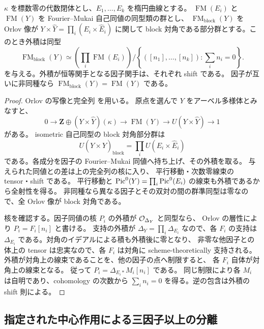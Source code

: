 \begin{lemma}
\label{mbfc:lem:factorization}
$\kappa$ を標数零の代数閉体とし、$E_1,\ldots,E_k$ を楕円曲線とする。
$\operatorname{FM}(E_i)$ と $\operatorname{FM}(Y)$ を
Fourier--Mukai 自己同値の同型類の群とし、
$\operatorname{FM}_{\mathrm{block}}(Y)$ を Orlov 像が
$Y\times\widehat Y=\prod_i(E_i\times\widehat E_i)$ に関して
block 対角である部分群とする。このとき外積は同型
\begin{equation}\label{mbfc:eq:factorization}
 \operatorname{FM}_{\mathrm{block}}(Y)
 \simeq
 \left(\prod_i\operatorname{FM}(E_i)\right)
 \big/
 \left\{([n_1],\ldots,[n_k]):\sum_i n_i=0\right\}.
\end{equation}
を与える。外積が恒等関手となる因子関手は、それぞれ shift である。
因子が互いに非同種なら $\operatorname{FM}_{\mathrm{block}}(Y)=\operatorname{FM}(Y)$ である。
\end{lemma}
\begin{proof}
Orlov の写像と完全列
\cite[Propositions~2.15, 3.3, Theorem~4.14]{MBFCOrlovAbelian}を用いる。
原点を選んで $Y$ をアーベル多様体とみなすと、
\[
 0\longrightarrow \mathbf Z\oplus(Y\times\widehat Y)(\kappa)
 \longrightarrow\operatorname{FM}(Y)
 \longrightarrow U(Y\times\widehat Y)\longrightarrow1
\]
がある。
isometric 自己同型の block 対角部分群は
\[
 U(Y\times\widehat Y)_{\mathrm{block}}=\prod_i U(E_i\times\widehat E_i)
\]
である。各成分を因子の Fourier--Mukai 同値へ持ち上げ、その外積を取る。
与えられた同値との差は上の完全列の核に入り、
平行移動・次数零線束の tensor・shift である。
平行移動と $\operatorname{Pic}^0(Y)=\prod_i\operatorname{Pic}^0(E_i)$ の線束も外積であるから全射性を得る。
非同種なら異なる因子とその双対の間の群準同型は零なので、全 Orlov 像が block 対角である。

核を確認する。因子同値の核 $P_i$ の外積が $\mathcal O_{\Delta_Y}$ と同型なら、
Orlov の層性\cite[Proposition~3.2]{MBFCOrlovAbelian}により
$P_i=F_i[n_i]$ と書ける。
支持の外積が $\Delta_Y=\prod_i\Delta_{E_i}$ なので、各 $F_i$ の支持は
$\Delta_{E_i}$ である。対角のイデアルによる積も外積後に零となり、
非零な他因子との体上の tensor は忠実なので、各 $F_i$ は対角に scheme-theoretically 支持される。
外積が対角上の線束であることを、他の因子の点へ制限すると、
各 $F_i$ 自体が対角上の線束となる。
従って $P_i=\Delta_{E_i*}M_i[n_i]$ である。
同じ制限により各 $M_i$ は自明であり、cohomology の次数から
$\sum_i n_i=0$ を得る。逆の包含は外積の shift 則による。
\end{proof}

\subsection{指定された中心作用による三因子以上の分離}


